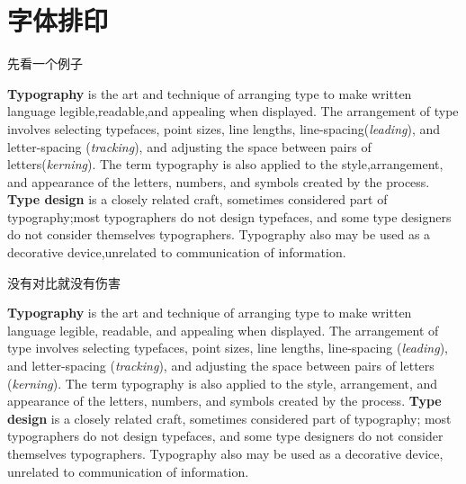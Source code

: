\section{字体排印}

\begin{frame}{先看一个例子}
\begin{minipage}{\textwidth}
  \ArphicKai\small
  \linespread{0.8}\selectfont
  \textbf{Typography} is the art and technique of arranging type to make written language
  legible,readable,and appealing when displayed. The arrangement of type involves selecting
  typefaces, point sizes, line lengths, line-spacing(\textit{leading}), and letter-spacing
  (\textit{tracking}), and adjusting the space between pairs of letters(\textit{kerning}).
  The term typography is also applied to the style,arrangement, and appearance of the letters,
  numbers, and symbols created by the process. \textbf{Type design} is a closely related craft,
  sometimes considered part of typography;most typographers do not design typefaces, and some
  type designers do not consider themselves typographers. Typography also may be used as a
  decorative device,unrelated to communication of information.
\end{minipage}
\end{frame}

\begin{frame}{没有对比就没有伤害}
\begin{minipage}{\textwidth}
  \Garamond\small
  \textbf{Typography} is the art and technique of arranging type to make written language
  legible, readable, and appealing when displayed. The arrangement of type involves selecting
  typefaces, point sizes, line lengths, line-spacing (\textit{leading}), and letter-spacing
  (\textit{tracking}), and adjusting the space between pairs of letters (\textit{kerning}).
  The term typography is also applied to the style, arrangement, and appearance of the letters,
  numbers, and symbols created by the process. \textbf{Type design} is a closely related craft,
  sometimes considered part of typography; most typographers do not design typefaces, and some
  type designers do not consider themselves typographers. Typography also may be used as a
  decorative device, unrelated to communication of information.
\end{minipage}
\end{frame}

